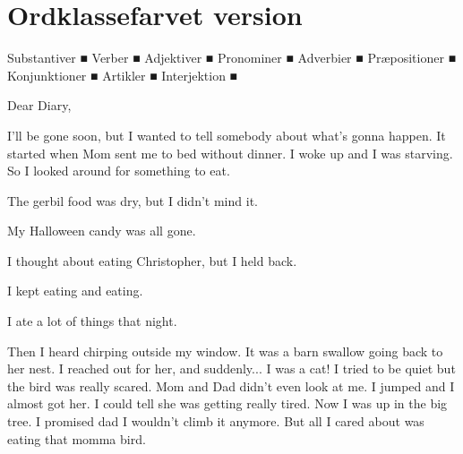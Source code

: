 \documentclass[10pt,a4paper]{article}
\newcommand{\noun}[1]{\textcolor{nouncolor}{#1}}
\newcommand{\wverb}[1]{\textcolor{verbcolor}{#1}}
\newcommand{\adj}[1]{\textcolor{adjcolor}{#1}}
\newcommand{\pron}[1]{\textcolor{proncolor}{#1}}
\newcommand{\adv}[1]{\textcolor{advcolor}{#1}}
\newcommand{\prep}[1]{\textcolor{prepcolor}{#1}}
\newcommand{\conj}[1]{\textcolor{conjcolor}{#1}}
\newcommand{\detw}[1]{\textcolor{detcolor}{#1}}
\newcommand{\interj}[1]{\textcolor{intcolor}{#1}}
\begin{document}
\newpage
\section*{Ordklassefarvet version}

{\small
\noun{Substantiver} \textcolor{nouncolor}{■} \quad
\noun{Verber} \textcolor{verbcolor}{■} \quad
\noun{Adjektiver} \textcolor{adjcolor}{■} \quad
\noun{Pronominer} \textcolor{proncolor}{■} \quad
\noun{Adverbier} \textcolor{advcolor}{■} \quad
\noun{Præpositioner} \textcolor{prepcolor}{■} \quad
\noun{Konjunktioner} \textcolor{conjcolor}{■} \quad
\noun{Artikler} \textcolor{detcolor}{■} \quad
\noun{Interjektion} \textcolor{intcolor}{■}
}

\bigskip

\interj{Dear} \noun{Diary},

\pron{I}'\wverb{ll} \wverb{be} \wverb{gone} \adv{soon}, \conj{but} \pron{I} \wverb{wanted} \prep{to} \wverb{tell} \noun{somebody} \prep{about} \pron{what}'\wverb{s} \wverb{gonna} \wverb{happen}. \pron{It} \wverb{started} \adv{when} \noun{Mom} \wverb{sent} \pron{me} \prep{to} \noun{bed} \prep{without} \noun{dinner}. \pron{I} \wverb{woke} \adv{up} \conj{and} \pron{I} \wverb{was} \adj{starving}. \adv{So} \pron{I} \wverb{looked} \adv{around} \prep{for} \noun{something} \prep{to} \wverb{eat}.

\detw{The} \noun{gerbil} \noun{food} \wverb{was} \adj{dry}, \conj{but} \pron{I} \wverb{didn't} \wverb{mind} \pron{it}.

\pron{My} \noun{Halloween} \noun{candy} \wverb{was} \adv{all} \wverb{gone}.

\pron{I} \wverb{thought} \prep{about} \wverb{eating} \noun{Christopher}, \conj{but} \pron{I} \wverb{held} \adv{back}.

\pron{I} \adv{kept} \wverb{eating} \conj{and} \wverb{eating}.

\pron{I} \wverb{ate} \detw{a} \adj{lot} \prep{of} \noun{things} \detw{that} \noun{night}.

\adv{Then} \pron{I} \wverb{heard} \noun{chirping} \adv{outside} \pron{my} \noun{window}. \pron{It} \wverb{was} \detw{a} \noun{barn} \noun{swallow} \wverb{going} \adv{back} \prep{to} \pron{her} \noun{nest}. \pron{I} \wverb{reached} \adv{out} \prep{for} \pron{her}, \conj{and} \adv{suddenly}... \pron{I} \wverb{was} \detw{a} \noun{cat}! \pron{I} \wverb{tried} \prep{to} \wverb{be} \adj{quiet} \conj{but} \detw{the} \noun{bird} \wverb{was} \adv{really} \adj{scared}. \noun{Mom} \conj{and} \noun{Dad} \wverb{didn't} \adv{even} \wverb{look} \prep{at} \pron{me}. \pron{I} \wverb{jumped} \conj{and} \pron{I} \adv{almost} \wverb{got} \pron{her}. \pron{I} \wverb{could} \wverb{tell} \pron{she} \wverb{was} \wverb{getting} \adv{really} \adj{tired}. \adv{Now} \pron{I} \wverb{was} \adv{up} \prep{in} \detw{the} \adj{big} \noun{tree}. \pron{I} \wverb{promised} \noun{dad} \pron{I} \wverb{wouldn't} \wverb{climb} \pron{it} \adv{anymore}. \conj{But} \adv{all} \pron{I} \wverb{cared} \prep{about} \wverb{was} \wverb{eating} \detw{that} \noun{momma} \noun{bird}.
\end{document}
